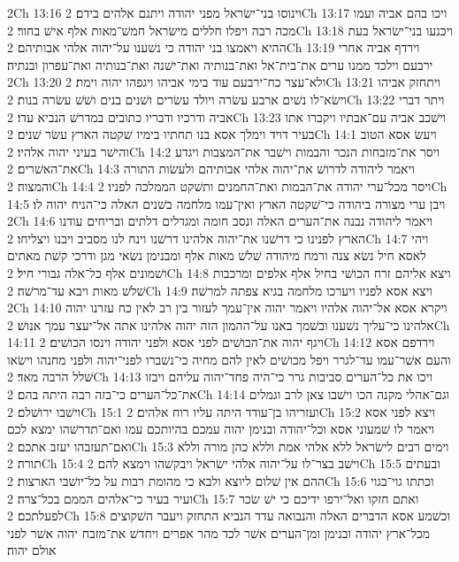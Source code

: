 2Ch 13:16  וינוסו בני־ישׂראל מפני יהודה ויתנם אלהים בידם׃
2Ch 13:17  ויכו בהם אביה ועמו מכה רבה ויפלו חללים מישׂראל חמשׁ־מאות אלף אישׁ בחור׃
2Ch 13:18  ויכנעו בני־ישׂראל בעת ההיא ויאמצו בני יהודה כי נשׁענו על־יהוה אלהי אבותיהם׃
2Ch 13:19  וירדף אביה אחרי ירבעם וילכד ממנו ערים את־בית־אל ואת־בנותיה ואת־ישׁנה ואת־בנותיה ואת־עפרון ובנתיה׃
2Ch 13:20  ולא־עצר כח־ירבעם עוד בימי אביהו ויגפהו יהוה וימת׃
2Ch 13:21  ויתחזק אביהו וישׂא־לו נשׁים ארבע עשׂרה ויולד עשׂרים ושׁנים בנים ושׁשׁ עשׂרה בנות׃
2Ch 13:22  ויתר דברי אביה ודרכיו ודבריו כתובים במדרשׁ הנביא עדו׃
2Ch 13:23  וישׁכב אביה עם־אבתיו ויקברו אתו בעיר דויד וימלך אסא בנו תחתיו בימיו שׁקטה הארץ עשׂר שׁנים׃
2Ch 14:1  ויעשׂ אסא הטוב והישׁר בעיני יהוה אלהיו׃
2Ch 14:2  ויסר את־מזבחות הנכר והבמות וישׁבר את־המצבות ויגדע את־האשׁרים׃
2Ch 14:3  ויאמר ליהודה לדרושׁ את־יהוה אלהי אבותיהם ולעשׂות התורה והמצוה׃
2Ch 14:4  ויסר מכל־ערי יהודה את־הבמות ואת־החמנים ותשׁקט הממלכה לפניו׃
2Ch 14:5  ויבן ערי מצורה ביהודה כי־שׁקטה הארץ ואין־עמו מלחמה בשׁנים האלה כי־הניח יהוה לו׃
2Ch 14:6  ויאמר ליהודה נבנה את־הערים האלה ונסב חומה ומגדלים דלתים ובריחים עודנו הארץ לפנינו כי דרשׁנו את־יהוה אלהינו דרשׁנו וינח לנו מסביב ויבנו ויצליחו׃
2Ch 14:7  ויהי לאסא חיל נשׂא צנה ורמח מיהודה שׁלשׁ מאות אלף ומבנימן נשׂאי מגן ודרכי קשׁת מאתים ושׁמונים אלף כל־אלה גבורי חיל׃
2Ch 14:8  ויצא אליהם זרח הכושׁי בחיל אלף אלפים ומרכבות שׁלשׁ מאות ויבא עד־מרשׁה׃
2Ch 14:9  ויצא אסא לפניו ויערכו מלחמה בגיא צפתה למרשׁה׃
2Ch 14:10  ויקרא אסא אל־יהוה אלהיו ויאמר יהוה אין־עמך לעזור בין רב לאין כח עזרנו יהוה אלהינו כי־עליך נשׁענו ובשׁמך באנו על־ההמון הזה יהוה אלהינו אתה אל־יעצר עמך אנושׁ׃
2Ch 14:11  ויגף יהוה את־הכושׁים לפני אסא ולפני יהודה וינסו הכושׁים׃
2Ch 14:12  וירדפם אסא והעם אשׁר־עמו עד־לגרר ויפל מכושׁים לאין להם מחיה כי־נשׁברו לפני־יהוה ולפני מחנהו וישׂאו שׁלל הרבה מאד׃
2Ch 14:13  ויכו את כל־הערים סביבות גרר כי־היה פחד־יהוה עליהם ויבזו את־כל־הערים כי־בזה רבה היתה בהם׃
2Ch 14:14  וגם־אהלי מקנה הכו וישׁבו צאן לרב וגמלים וישׁבו ירושׁלם׃
2Ch 15:1  ועזריהו בן־עודד היתה עליו רוח אלהים׃
2Ch 15:2  ויצא לפני אסא ויאמר לו שׁמעוני אסא וכל־יהודה ובנימן יהוה עמכם בהיותכם עמו ואם־תדרשׁהו ימצא לכם ואם־תעזבהו יעזב אתכם׃
2Ch 15:3  וימים רבים לישׂראל ללא אלהי אמת וללא כהן מורה וללא תורה׃
2Ch 15:4  וישׁב בצר־לו על־יהוה אלהי ישׂראל ויבקשׁהו וימצא להם׃
2Ch 15:5  ובעתים ההם אין שׁלום ליוצא ולבא כי מהומת רבות על כל־יושׁבי הארצות׃
2Ch 15:6  וכתתו גוי־בגוי ועיר בעיר כי־אלהים הממם בכל־צרה׃
2Ch 15:7  ואתם חזקו ואל־ירפו ידיכם כי ישׁ שׂכר לפעלתכם׃
2Ch 15:8  וכשׁמע אסא הדברים האלה והנבואה עדד הנביא התחזק ויעבר השׁקוצים מכל־ארץ יהודה ובנימן ומן־הערים אשׁר לכד מהר אפרים ויחדשׁ את־מזבח יהוה אשׁר לפני אולם יהוה׃
